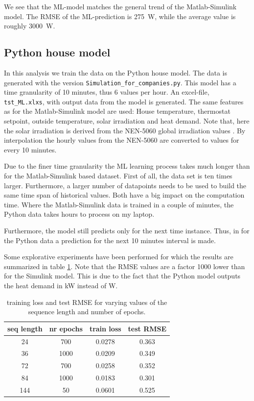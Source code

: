 We see that the ML-model matches the general trend of the Matlab-Simulink model. The RMSE of the ML-prediction is 275~W, while the average value is roughly 3000~W. 


\subsection{Python house model}
In this analysis we train the data on the Python house model. The data is generated with the version \texttt{Simulation\_for\_companies.py}. This model has a time granularity of 10 minutes, thus 6 values per hour. An excel-file, \texttt{tst\_ML.xlxs}, with output data from the model is generated. The same features as for the Matlab-Simulink model are used: House temperature, thermostat setpoint, outside temperature, solar irradiation and heat demand. Note that, here the solar irradiation is derived from the NEN-5060 global irradiation values \cite{NEN5060}. By interpolation the hourly values from the NEN-5060 are converted to values for every 10 minutes.  

Due to the finer time granularity the ML learning process takes much longer than for the Matlab-Simulink based dataset. First of all, the data set is ten times larger. Furthermore, a larger number of datapoints needs to be used to build the same time span of historical values. Both have a big impact on the computation time. Where the Matlab-Simulink data is trained in a couple of minutes, the Python data takes hours to process on my laptop. 

Furthermore, the model still predicts only for the next time instance. Thus, in for the Python data a prediction for the next 10 minutes interval is made.  

Some explorative experiments have been performed for which the results are summarized in table \ref{tab:results_python}. Note that the RMSE values are a factor 1000 lower than for the Simulink model. This is due to the fact that the Python model outputs the heat demand in kW instead of W. 

\begin{table}
	\centering
		\begin{tabular}{c|c|c|c}
				\hline
					seq length & nr epochs & train loss & test RMSE  \\
				\hline
				\hline
					24 & 700 & 0.0278 & 0.363 \\
					36 & 1000 & 0.0209	& 0.349 \\
					72 & 700 & 0.0258	& 0.352 \\
					84 & 1000 & 0.0183 & 0.301\\
					144 & 50 & 0.0601 & 0.525\\
					\hline
		\end{tabular}
	\caption{training loss and test RMSE for varying values of the sequence length and number of epochs. }
	\label{tab:results_python}
\end{table}
 

